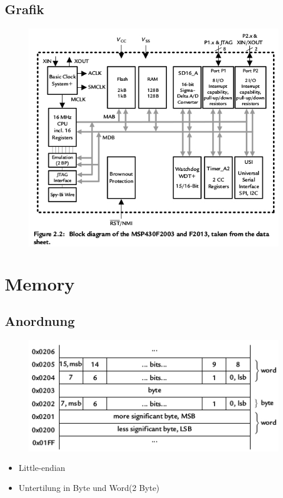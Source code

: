 \documentclass{beamer}
\begin{document}
\subsection{Grafik}
\begin{frame}
\begin{figure}[b]
\includegraphics[scale=0.63]{MSP430_block_dia.jpg}
\end{figure}
\end{frame}
\section{Memory}
\subsection{Anordnung}
\begin{frame}
\begin{figure}[t]
\includegraphics[scale=0.7]{MSP430_mem_small_dia.jpg}
\end{figure}
\begin{itemize}
\item Little-endian 
\item Untertilung in Byte und Word(2 Byte)
\end{itemize}
\end{frame}
\end{document}
